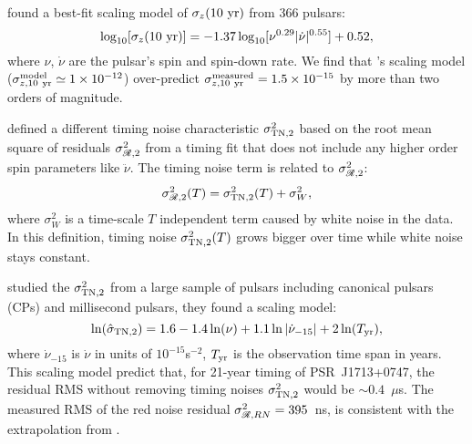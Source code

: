{\bfref
\citet{hlk10} found a best-fit scaling model of $\sigma_z({\rm 10~yr})$ 
from 366 pulsars:
\begin{equation}
\label{eq:hlk10}
\log_{10}[\sigma_z({\rm 10~yr})] =
-1.37\log_{10}[\nu^{0.29}|\dot{\nu}|^{0.55}]+0.52,
\end{equation} 
where $\nu$, $\dot{\nu}$ are the pulsar's spin and spin-down rate.
We find that \citet{hlk10}'s scaling model ($\sigma^{\rm model}_{z, \rm
10~yr}\simeq1\times10^{-12}$) over-predict $\sigma^{\rm measured}_{z, \rm
10~yr}=1.5\times10^{-15}$ by more than two orders of magnitude. 

\citet{ch80} defined a different timing noise characteristic $\sigma^2_{\rm
TN,2}$ based on the root mean square of residuals $\sigma^2_{\mathscr{R},2}$ from a
timing fit that does not include any higher order spin parameters like
$\ddot{\nu}$. 
The timing noise term is related to $\sigma^2_{\mathscr{R},2}$:
\begin{equation}
\sigma^2_{\mathscr{R},2}(T) = \sigma^2_{\rm TN,2}(T) + \sigma^2_W, 
\end{equation}
where $\sigma^2_W$ is a time-scale $T$ independent term caused by white 
noise in the data.
In this definition, timing noise $\sigma^2_{\rm TN,2}(T)$ grows bigger over
time while white noise stays constant.  

\citet{sc10} studied the $\sigma^2_{\rm TN,2}$ from a large sample of pulsars
including canonical pulsars (CPs) and millisecond pulsars, they found a scaling
model:
\begin{equation}
\label{eq:sc10}
\ln(\hat{\sigma}_{\rm TN,2}) = 1.6 - 1.4\ln(\nu) +
1.1\ln|\dot{\nu}_{-15}|+2\ln(T_{\rm yr}),
\end{equation}
where $\dot{\nu}_{-15}$ is $\dot{\nu}$ in units of $10^{-15}$s$^{-2}$, $T_{\rm yr}$
is the observation time span in years.
This scaling model predict that, for 21-year timing of PSR~J1713+0747, the
residual RMS without removing timing noises $\sigma^2_{\rm TN,2}$ would be
$\sim0.4$~$\mu $s. The measured RMS of the red noise residual 
$\sigma^2_{\mathscr{R},RN}=395$~ns, is consistent with the extrapolation
from \citet{sc10}. }

